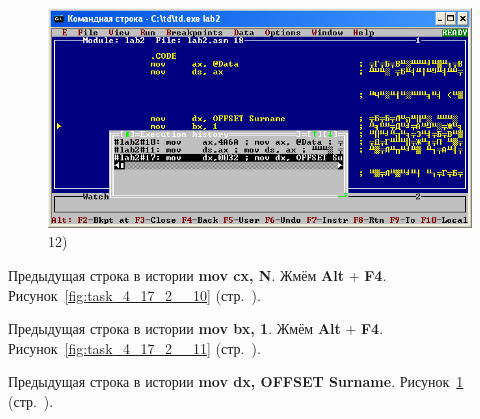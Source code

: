 \begin{figure}[!htp]
    \begin {minipage}{0.32\textwidth}
        \centering
        \includegraphics[width=.99\linewidth]
            {../_INCLUDES/task-4-17-2/12.png}
        \caption{12) }
        \label{fig:task_4_17_2__12}
    \end{minipage}
\end{figure}

Предыдущая строка в истории \textbf{mov cx, N}.
Жмём \textbf{Alt} + \textbf{F4}.
Рисунок~\ref{fig:task_4_17_2__10} (стр.~\pageref{fig:task_4_17_2__10}).

Предыдущая строка в истории \textbf{mov bx, 1}.
Жмём \textbf{Alt} + \textbf{F4}.
Рисунок~\ref{fig:task_4_17_2__11} (стр.~\pageref{fig:task_4_17_2__11}).

Предыдущая строка в истории \textbf{mov dx, OFFSET Surname}.
Рисунок~\ref{fig:task_4_17_2__12} (стр.~\pageref{fig:task_4_17_2__12}).

